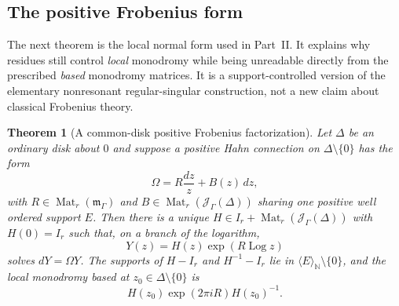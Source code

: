 \documentclass[11pt,letterpaper]{article}
\newtheorem{theorem}{Theorem}[section]
\theoremstyle{definition}
\theoremstyle{remark}
\newcommand{\N}{\mathbb N}
\newcommand{\JJ}{\mathscr J_\Gamma}
\newcommand{\mm}{\mathfrak m_\Gamma}
\newcommand{\Mat}{\operatorname{Mat}}
\newcommand{\Log}{\operatorname{Log}}
\newcommand{\angles}[1]{\langle #1\rangle_{\N}}
\numberwithin{equation}{section}
\begin{document}
\subsection{The positive Frobenius form}

The next theorem is the local normal form used in Part~II. It explains why
residues still control \emph{local} monodromy while being unreadable directly
from the prescribed \emph{based} monodromy matrices. It is a
support-controlled version of the elementary nonresonant regular-singular
construction, not a new claim about classical Frobenius theory.

\begin{theorem}[A common-disk positive Frobenius factorization]
\label{nab:thm:frobenius}
Let $\Delta$ be an ordinary disk about $0$ and suppose a positive Hahn
connection on $\Delta\setminus\{0\}$ has the form
\begin{equation}\label{nab:eq:localconnection}
 \Omega=R\frac{dz}{z}+B(z)\,dz,
\end{equation}
with $R\in\Mat_r(\mm)$ and $B\in\Mat_r(\JJ(\Delta))$ sharing one positive well
ordered support $E$. Then there is a unique
$H\in I_r+\Mat_r(\JJ(\Delta))$ with $H(0)=I_r$ such that, on a branch of the
logarithm,
\begin{equation}\label{nab:eq:frobenius}
 Y(z)=H(z)\exp(R\Log z)
\end{equation}
solves $dY=\Omega Y$. The supports of $H-I_r$ and $H^{-1}-I_r$ lie in
$\angles E\setminus\{0\}$, and the local monodromy based at
$z_0\in\Delta\setminus\{0\}$ is
\begin{equation}\label{nab:eq:localmonodromy}
 H(z_0)\exp(2\pi iR)H(z_0)^{-1}.
\end{equation}
\end{theorem}
\end{document}
